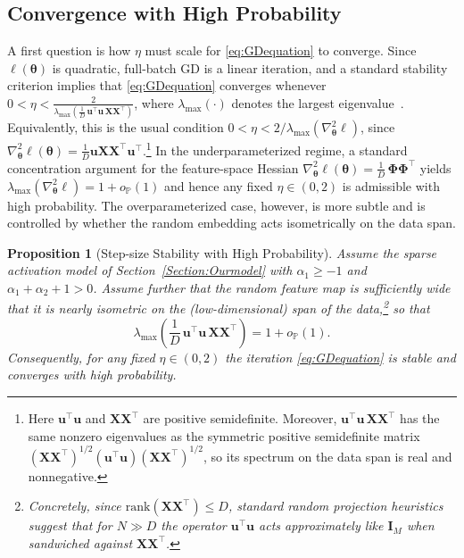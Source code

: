 \documentclass[11pt]{article}
\theoremstyle{plain}
\newtheorem{proposition}[theorem]{Proposition}
\theoremstyle{definition}
\theoremstyle{remark}
\newcommand{\JSCheck}[1]{#1}
\begin{document}
\subsection{Convergence with High Probability}

\JSCheck{A first question is how $\eta$ must scale for \eqref{eq:GDequation} to converge.
Since $\ell(\boldsymbol{\theta})$ is quadratic, full-batch GD is a linear iteration, and a standard stability criterion implies that \eqref{eq:GDequation} converges whenever $0<\eta<\frac{2}{\lambda_{\max}\!\left(\frac{1}{D}\,\mathbf{u}^\top\mathbf{u}\,\mathbf{X}\mathbf{X}^\top\right)}$, where $\lambda_{\max}(\cdot)$ denotes the largest eigenvalue~\citep{nesterov2004introductory}. Equivalently, this is the usual condition $0<\eta<2/\lambda_{\max}(\nabla_{\boldsymbol{\theta}}^2\ell)$, since $\nabla_{\boldsymbol{\theta}}^2\ell(\boldsymbol{\theta})=\frac{1}{D}\mathbf{u}\mathbf{X}\mathbf{X}^\top\mathbf{u}^\top$.\footnote{Here $\mathbf{u}^\top\mathbf{u}$ and $\mathbf{X}\mathbf{X}^\top$ are positive semidefinite. Moreover, $\mathbf{u}^\top\mathbf{u}\,\mathbf{X}\mathbf{X}^\top$ has the same nonzero eigenvalues as the symmetric positive semidefinite matrix $(\mathbf{X}\mathbf{X}^\top)^{1/2}(\mathbf{u}^\top\mathbf{u})(\mathbf{X}\mathbf{X}^\top)^{1/2}$, so its spectrum on the data span is real and nonnegative.} 
In the underparameterized regime, a standard concentration argument for the feature-space Hessian $\nabla_{\boldsymbol{\theta}}^2 \ell(\boldsymbol{\theta})=\frac{1}{D}\,\boldsymbol{\Phi}\boldsymbol{\Phi}^\top$ yields $\lambda_{\max}(\nabla_{\boldsymbol{\theta}}^2 \ell)=1+o_{\mathbb{P}}(1)$ and hence any fixed $\eta\in(0,2)$ is admissible with high probability. The overparameterized case, however, is more subtle and is controlled by whether the random embedding acts isometrically on the data span.}

\begin{proposition}[Step-size Stability with High Probability]
\label{thm:gd_eta2_hpg}
Assume the sparse activation model of Section~\ref{Section:Ourmodel} with $\alpha_1\geq-1$ and
$\alpha_1+\alpha_2+1>0$. Assume further that the random feature map is sufficiently wide that it is
nearly isometric on the (low-dimensional) span of the data,\footnote{Concretely, since
$\mathrm{rank}(\mathbf{X}\mathbf{X}^\top)\le D$, standard random projection heuristics suggest that for
$N\gg D$ the operator $\mathbf{u}^\top\mathbf{u}$ acts approximately like $\mathbf{I}_M$ when sandwiched
against $\mathbf{X}\mathbf{X}^\top$.}
so that
\begin{equation}
\lambda_{\max}\!\left(\frac{1}{D}\,\mathbf{u}^\top\mathbf{u}\,\mathbf{X}\mathbf{X}^\top\right)
= 1 + o_{\mathbb{P}}(1).
\end{equation}
Consequently, for any fixed $\eta\in(0,2)$ the iteration \eqref{eq:GDequation} is stable and converges with
high probability.
\end{proposition}
\end{document}
